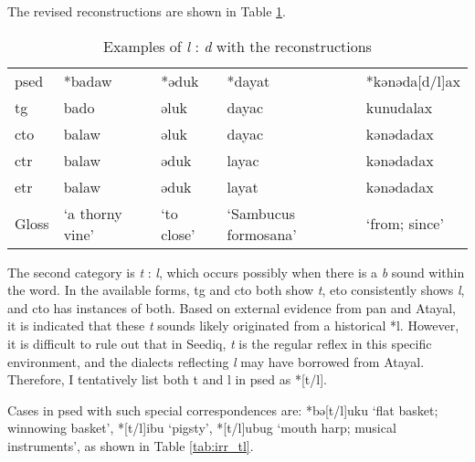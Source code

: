The revised reconstructions are shown in Table \ref{tab:irr_ld2}. 

\begin{table}[!htbp]
\centering
\caption{Examples of \textit{l} : \textit{d} with the reconstructions}
\label{tab:irr_ld2}
\begin{tabular}{lllll}
\hline
\acs{psed} & *badaw          & *əduk    & *dayat             & *kənəda[d/l]ax    \\ \hdashline
\acs{tg}   & bado            & əluk       & dayac                & kunudalax     \\
\acs{cto}  & balaw           & əluk       & dayac                & kənədadax     \\
\acs{ctr}  & balaw           & əduk       & layac                & kənədadax     \\
\acs{etr}  & balaw           & əduk       & layat                & kənədadax     \\ \hline
Gloss      & `a thorny vine' & `to close' & `Sambucus formosana' & `from; since' \\ \hline
\end{tabular}
\end{table}

The second category is \textit{t} : \textit{l}, which occurs possibly when there is a \textit{b} sound within the word. In the available forms, \acl{tg} and \acl{cto} both show \textit{t}, \acl{eto} consistently shows \textit{l}, and \acl{cto} has instances of both. Based on external evidence from \acl{pan} and Atayal, it is indicated that these \textit{t} sounds likely originated from a historical *l. However, it is difficult to rule out that in Seediq, \textit{t} is the regular reflex in this specific environment, and the dialects reflecting \textit{l} may have borrowed from Atayal. Therefore, I tentatively list both t and l in \acl{psed} as *[t/l].

Cases in \acl{psed} with such special correspondences are: *bə[t/l]uku `flat basket; winnowing basket', *[t/l]ibu `pigsty', *[t/l]ubug `mouth harp; musical instruments', as shown in Table \ref{tab:irr_tl}.

